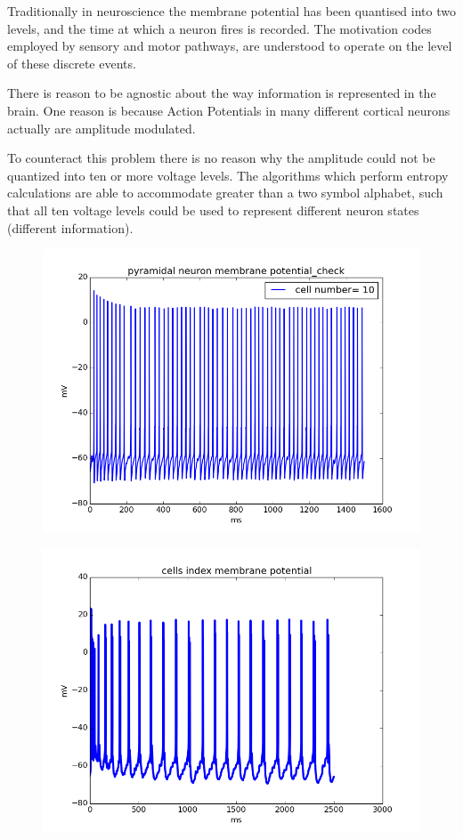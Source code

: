 \documentclass{beamer}
\begin{document}
\begin{frame}
Traditionally in neuroscience the membrane potential has been quantised into two levels, and the time at which a neuron fires is recorded. The motivation codes employed by sensory and motor pathways, are understood to operate on the level of these discrete events.

There is reason to be agnostic about the way information is represented in the brain. One reason is because Action Potentials in many different cortical neurons actually are amplitude modulated.

To counteract this problem there is no reason why the amplitude could not be quantized into ten or more voltage levels. The algorithms which perform entropy calculations are able to accommodate greater than a two symbol alphabet, such that all ten voltage levels could be used to represent different neuron states (different information).
\begin{figure}
\includegraphics[scale=0.2]{pyr_nrn_memb_potential_in_degree_check0_0500_015001_00_085_01_010_0.png}
\end{figure}
\end{frame}

\begin{frame}
\begin{figure}
\includegraphics[scale=0.2]{traces_all0_0500_025001_00_0100_03_010_0.png}
\end{figure}


\end{frame}


\end{document}
